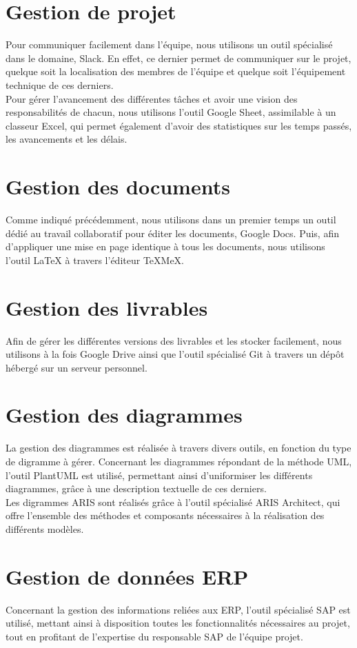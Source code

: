 \section{Gestion de projet}

Pour communiquer facilement dans l’équipe, nous utilisons un outil spécialisé dans le domaine, Slack. En effet, ce dernier permet de communiquer sur le projet, quelque soit la localisation des membres de l’équipe et quelque soit l’équipement technique de ces derniers. \\

Pour gérer l’avancement des différentes tâches et avoir une vision des responsabilités de chacun, nous utilisons l’outil Google Sheet, assimilable à un classeur Excel, qui permet également d’avoir des statistiques sur les temps passés, les avancements et les délais.

\section{Gestion des documents}

Comme indiqué précédemment, nous utilisons dans un premier temps un outil dédié au travail collaboratif pour éditer les documents, Google Docs. Puis, afin d’appliquer une mise en page identique à tous les documents, nous utilisons l’outil LaTeX à travers l’éditeur TeXMeX.

\section{Gestion des livrables}

Afin de gérer les différentes versions des livrables et les stocker facilement, nous utilisons à la fois Google Drive ainsi que l’outil spécialisé Git à travers un dépôt hébergé sur un serveur personnel.

\section{Gestion des diagrammes}

La gestion des diagrammes est réalisée à travers divers outils, en fonction du type de digramme à gérer. Concernant les diagrammes répondant de la méthode UML, l’outil PlantUML est utilisé, permettant ainsi d’uniformiser les différents diagrammes, grâce à une description textuelle de ces derniers. \\

Les digrammes ARIS sont réalisés grâce à l’outil spécialisé ARIS Architect, qui offre l’ensemble des méthodes et composants nécessaires à la réalisation des différents modèles.

\section{Gestion de données ERP}

Concernant la gestion des informations reliées aux ERP, l’outil spécialisé SAP est utilisé, mettant ainsi à disposition toutes les fonctionnalités nécessaires au projet, tout en profitant de l’expertise du responsable SAP de l’équipe projet.